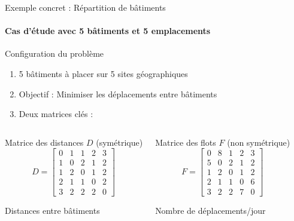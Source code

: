 \documentclass[10pt, handout]{beamer}
\begin{document}
\begin{frame}{Exemple concret : Répartition de bâtiments}
    \framesubtitle{Cas d'étude avec 5 bâtiments et 5 emplacements}

    \begin{block}{Configuration du problème}
        \begin{enumerate}
            \item 5 bâtiments à placer sur 5 sites géographiques
            \item Objectif : Minimiser les déplacements entre bâtiments
            \item Deux matrices clés :
        \end{enumerate}
    \end{block}

    \begin{columns}[T]
        \begin{exampleblock}{Matrice des distances \(D\) (symétrique)}
            \[
                D = \begin{bmatrix}
                    0 & 1 & 1 & 2 & 3 \\
                    1 & 0 & 2 & 1 & 2 \\
                    1 & 2 & 0 & 1 & 2 \\
                    2 & 1 & 1 & 0 & 2 \\
                    3 & 2 & 2 & 2 & 0
                \end{bmatrix}
            \]
            \begin{footnotesize}
                \begin{center}
                    Distances entre bâtiments
                \end{center}
            \end{footnotesize}
        \end{exampleblock}

        \begin{exampleblock}{Matrice des flots \(F\) (non symétrique)}
            \[
                F = \begin{bmatrix}
                    0 & 8 & 1 & 2 & 3 \\
                    5 & 0 & 2 & 1 & 2 \\
                    1 & 2 & 0 & 1 & 2 \\
                    2 & 1 & 1 & 0 & 6 \\
                    3 & 2 & 2 & 7 & 0
                \end{bmatrix}
            \]
            \begin{footnotesize}
                \begin{center}
                    Nombre de déplacements/jour
                \end{center}
            \end{footnotesize}
        \end{exampleblock}
    \end{columns}

\end{frame}
\end{document}
